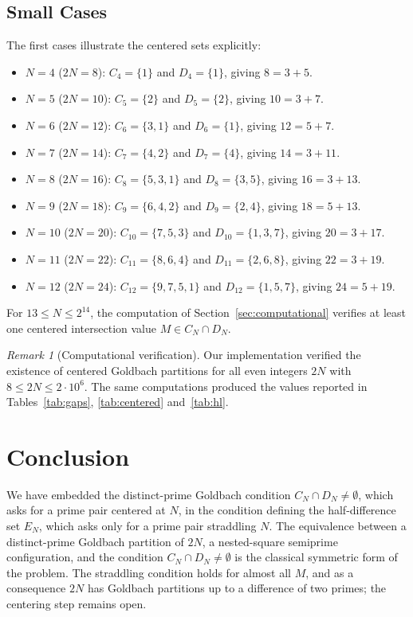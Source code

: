 \documentclass[11pt]{amsart}
\theoremstyle{definition}
\theoremstyle{remark}
\newtheorem{Remark}[Theorem]{Remark}
\begin{document}
\subsection{Small Cases}\label{subsec:small}
The first cases illustrate the centered sets explicitly:
\begin{itemize}
\item \textbf{$N=4$} ($2N=8$): $C_4=\{1\}$ and $D_4=\{1\}$, giving $8=3+5$.
\item \textbf{$N=5$} ($2N=10$): $C_5=\{2\}$ and $D_5=\{2\}$, giving $10=3+7$.
\item \textbf{$N=6$} ($2N=12$): $C_6=\{3,1\}$ and $D_6=\{1\}$, giving $12=5+7$.
\item \textbf{$N=7$} ($2N=14$): $C_7=\{4,2\}$ and $D_7=\{4\}$, giving $14=3+11$.
\item \textbf{$N=8$} ($2N=16$): $C_8=\{5,3,1\}$ and $D_8=\{3,5\}$, giving $16=3+13$.
\item \textbf{$N=9$} ($2N=18$): $C_9=\{6,4,2\}$ and $D_9=\{2,4\}$, giving $18=5+13$.
\item \textbf{$N=10$} ($2N=20$): $C_{10}=\{7,5,3\}$ and $D_{10}=\{1,3,7\}$, giving $20=3+17$.
\item \textbf{$N=11$} ($2N=22$): $C_{11}=\{8,6,4\}$ and $D_{11}=\{2,6,8\}$, giving $22=3+19$.
\item \textbf{$N=12$} ($2N=24$): $C_{12}=\{9,7,5,1\}$ and $D_{12}=\{1,5,7\}$, giving $24=5+19$.
\end{itemize}
For $13\leq N\leq 2^{14}$, the computation of Section~\ref{sec:computational} verifies at least one centered intersection value $M\in C_N\cap D_N$.

\begin{Remark}[Computational verification]
Our implementation verified the existence of centered Goldbach partitions for all even integers $2N$ with $8\leq 2N\leq 2\cdot 10^6$. The same computations produced the values reported in Tables~\ref{tab:gaps}, \ref{tab:centered} and~\ref{tab:hl}.
\end{Remark}
\section{Conclusion}\label{sec:conclusion}
We have embedded the distinct-prime Goldbach condition $C_N\cap D_N\neq\emptyset$, which asks for a prime pair centered at $N$, in the condition defining the half-difference set $E_N$, which asks only for a prime pair straddling $N$. The equivalence between a distinct-prime Goldbach partition of $2N$, a nested-square semiprime configuration, and the condition $C_N\cap D_N\neq\emptyset$ is the classical symmetric form of the problem. The straddling condition holds for almost all $M$, and as a consequence $2N$ has Goldbach partitions up to a difference of two primes; the centering step remains open.
\end{document}
